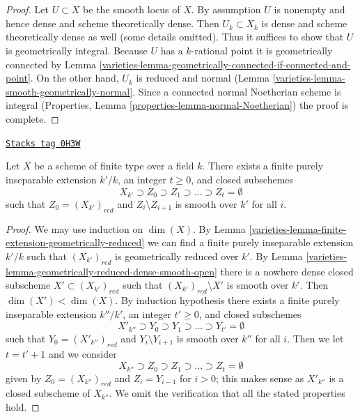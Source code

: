 \begin{proof}

Let $U \subset X$ be the smooth locus of $X$. By assumption $U$ is nonempty
and hence dense and scheme theoretically dense. Then
$U_{\overline{k}} \subset X_{\overline{k}}$ is dense and
scheme theoretically dense as well (some details omitted).
Thus it suffices to show that $U$ is geometrically integral.
Because $U$ has a $k$-rational point it is geometrically connected
by Lemma \ref{varieties-lemma-geometrically-connected-if-connected-and-point}.
On the other hand, $U_{\overline{k}}$ is reduced and normal
(Lemma \ref{varieties-lemma-smooth-geometrically-normal}.
Since a connected normal Noetherian scheme
is integral (Properties, Lemma \ref{properties-lemma-normal-Noetherian})
the proof is complete.
\end{proof}

\begin{lemma}
\label{varieties-lemma-smooth-stratification}
\href{https://stacks.math.columbia.edu/tag/0H3W}{\texttt{Stacks tag 0H3W}}

Let $X$ be a scheme of finite type over a field $k$.
There exists a finite purely inseparable extension $k'/k$,
an integer $t \geq 0$, and closed subschemes
$$
X_{k'} \supset Z_0 \supset Z_1 \supset \ldots \supset Z_t = \emptyset
$$
such that $Z_0 = (X_{k'})_{red}$ and $Z_i \setminus Z_{i + 1}$
is smooth over $k'$ for all $i$.
\end{lemma}

\begin{proof}

We may use induction on $\dim(X)$. By
Lemma \ref{varieties-lemma-finite-extension-geometrically-reduced}
we can find a finite purely inseparable extension $k'/k$
such that $(X_{k'})_{red}$ is geometrically reduced over $k'$.
By Lemma \ref{varieties-lemma-geometrically-reduced-dense-smooth-open}
there is a nowhere dense closed subscheme $X' \subset (X_{k'})_{red}$
such that $(X_{k'})_{red} \setminus X'$ is smooth over $k'$.
Then $\dim(X') < \dim(X)$. By induction hypothesis there exists
a finite purely inseparable extension $k''/k'$,
an integer $t' \geq 0$, and closed subschemes
$$
X'_{k''} \supset Y_0 \supset Y_1 \supset \ldots \supset Y_{t'} = \emptyset
$$
such that $Y_0 = (X'_{k''})_{red}$ and $Y_i \setminus Y_{i + 1}$
is smooth over $k''$ for all $i$. Then we let $t = t' + 1$
and we consider
$$
X_{k''} \supset Z_0 \supset Z_1 \supset \ldots \supset Z_t = \emptyset
$$
given by $Z_0 = (X_{k''})_{red}$ and $Z_i = Y_{i - 1}$ for $i > 0$;
this makes sense as $X'_{k''}$ is a closed subscheme of $X_{k''}$.
We omit the verification that all the stated properties hold.
\end{proof}

